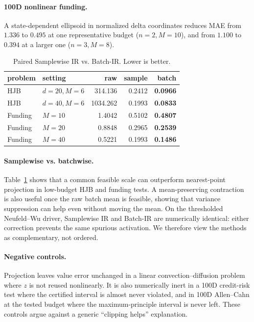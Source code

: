 \paragraph{100D nonlinear funding.}
A state-dependent ellipsoid in normalized delta coordinates reduces MAE from $1.336$ to $0.495$ at one representative budget ($n=2,M=10$), and from $1.100$ to $0.394$ at a larger one ($n=3,M=8$).

\begin{table}[t]
\caption{Paired Samplewise IR vs. Batch-IR. Lower is better.}
\label{tab:batch}
\centering\small
\begin{tabular}{llrrr}
\toprule
problem & setting & raw & sample & batch\\
\midrule
HJB & $d=20,M=6$ &314.136&0.2412&\textbf{0.0966}\\
HJB & $d=40,M=6$ &1034.262&0.1993&\textbf{0.0833}\\
Funding & $M=10$ &1.4042&0.5102&\textbf{0.4807}\\
Funding & $M=20$ &0.8848&0.2965&\textbf{0.2539}\\
Funding & $M=40$ &0.5221&0.1993&\textbf{0.1486}\\
\bottomrule
\end{tabular}
\end{table}

\paragraph{Samplewise vs. batchwise.}
Table~\ref{tab:batch} shows that a common feasible scale can outperform nearest-point projection in low-budget HJB and funding tests. A mean-preserving contraction is also useful once the raw batch mean is feasible, showing that variance suppression can help even without moving the mean. On the thresholded Neufeld--Wu driver, Samplewise IR and Batch-IR are numerically identical: either correction prevents the same spurious activation. We therefore view the methods as complementary, not ordered.

\paragraph{Negative controls.}
Projection leaves value error unchanged in a linear convection--diffusion problem where $z$ is not reused nonlinearly. It is also numerically inert in a 100D credit-risk test where the certified interval is almost never violated, and in 100D Allen--Cahn at the tested budget where the maximum-principle interval is never left. These controls argue against a generic ``clipping helps'' explanation.

